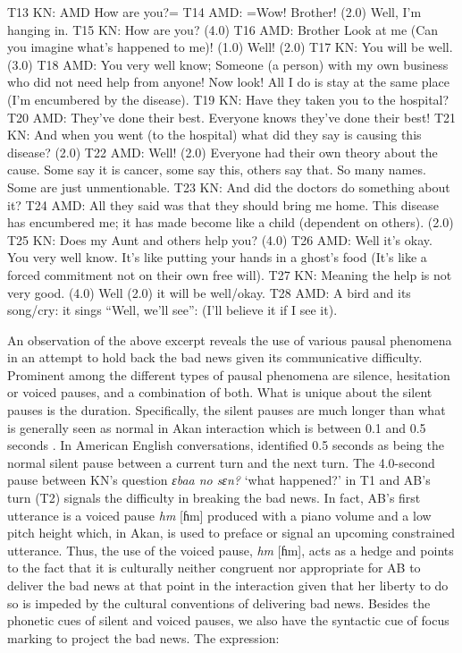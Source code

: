 \documentclass[output=paper,colorlinks,citecolor=brown]{langscibook}
\begin{document}
\begin{exe}
     T13 KN: AMD How are you?=
     T14 AMD: =Wow! Brother! (2.0) Well, I’m hanging in.
     T15 KN: How are you? (4.0)
     T16 AMD: Brother Look at me (Can you imagine what’s happened to me)! (1.0) Well! (2.0)
     T17 KN: You will be well. (3.0)
     T18 AMD: You very well know; Someone (a person) with my own business who did not need help from anyone! Now look! All I do is stay at the same place (I’m encumbered by the disease).
     T19 KN: Have they taken you to the hospital?
     T20 AMD: They’ve done their best. Everyone knows they’ve done their best!
     T21 KN: And when you went (to the hospital) what did they say is causing this disease? (2.0)
     T22 AMD: Well! (2.0) Everyone had their own theory about the cause. Some say it is cancer, some say this, others say that. So many names. Some are just unmentionable.
     T23 KN: And did the doctors do something about it?
     T24 AMD: All they said was that they should bring me home. This disease has encumbered me; it has made become like a child (dependent on others). (2.0)
     T25 KN: Does my Aunt and others help you? (4.0)
     T26 AMD: Well it’s okay. You very well know. It’s like putting your hands in a ghost’s food (It’s like a forced commitment not on their own free will).
     T27 KN: Meaning the help is not very good. (4.0) Well (2.0) it will be well\slash okay.
     T28 AMD: A bird and its song/cry: it sings “Well, we’ll see'': (I’ll believe it if I see it).
\end{exe}

An observation of the above excerpt reveals the use of various pausal phenomena in an attempt to hold back the bad news given its communicative difficulty. Prominent among the different types of pausal phenomena are silence, hesitation or voiced pauses, and a combination of both. What is unique about the silent pauses is the duration. Specifically, the silent pauses are much longer than what is generally seen as normal in Akan interaction which is between 0.1 and 0.5 seconds \citep{Obeng1987, Obeng1989, Obeng1999} . In American English conversations, \citet{jefferson1983} identified 0.5 seconds as being the normal silent pause between a current turn and the next turn. The 4.0-second pause between KN’s question \textit{ɛbaa no sɛn?} ‘what happened?’ in T1 and AB’s turn (T2) signals the difficulty in breaking the bad news. In fact, AB’s first utterance is a voiced pause \textit{hm} [ɦm] produced with a piano volume and a low pitch height which, in Akan, is used to preface or signal an upcoming constrained utterance. Thus, the use of the voiced pause, \textit{hm} [ɦm], acts as a hedge and points to the fact that it is culturally neither congruent nor appropriate for AB to deliver the bad news at that point in the interaction given that her liberty to do so is impeded by the cultural conventions of delivering bad news. Besides the phonetic cues of silent and voiced pauses, we also have the syntactic cue of focus marking to project the bad news. The expression:\largerpage
\end{document}

